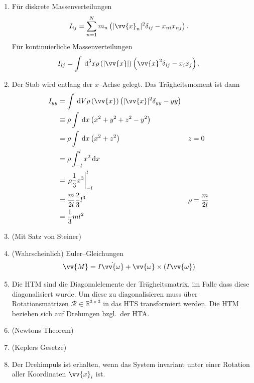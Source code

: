 \documentclass[a4paper,12pt]{article}
\newcommand{\td}{\,\text{d}}
\numberwithin{equation}{section}
\begin{document}
\begin{enumerate}[label=\arabic*.]
        \item Für diskrete Massenverteilungen
                \begin{align*} 
                        I_{ij}&=\sum_{n=1}^{N}m_n\left(|\vv{x}_n|^2\delta _{ij}-x_{ni}x_{nj}\right)
                .\end{align*} 
                Für kontinuierliche Massenverteilungen
                \begin{align*} 
                        I_{ij}&=\int_{}^{}\td ^3x\rho \left(|\vv{x}|\right)\left(\vv{x}^2\delta _{ij}-x_ix_j\right)
                .\end{align*} 
        \item Der Stab wird entlang der $x$--Achse gelegt. Das Trägheitsmoment ist dann
                \begin{align*} 
                        I_{yy}&=\int_{}^{}\td V\rho \left(\vv{x}\right)\left(|\vv{x}|^2\delta _{yy}-yy\right)\\
                              &\equiv \rho \int_{}^{}\td x\left(x^2+y^2+z^2-y^2\right)\\
                              &=\rho \int_{}^{}\td x\left(x^2+z^2\right)&&z=0\\
                              &=\rho \int_{-l}^{l}x^2\td x\\
                              &=\left.\rho \dfrac{1}{3}x^3\right|_{-l}^l\\
                              &=\dfrac{m}{2l}\dfrac{2}{3}l^3&&\rho =\dfrac{m}{2l}\\
                              &=\dfrac{1}{3}ml^2
                \end{align*} 
        \item (Mit Satz von Steiner)
        \item (Wahrscheinlich) Euler--Gleichungen
                \begin{align*} 
                        \vv{M}&=I\dot{\vv{\omega }}+\vv{\omega }\times \left(I\vv{\omega }\right)
                \end{align*} 
        \item Die HTM sind die Diagonalelemente der Trägheitsmatrix, im Falle dass diese diagonalisiert wurde. Um diese zu diagonalisieren muss über Rotationsmatrizen $\mathcal{R} \in \mathbb{R}^{3\times 3}$ in das HTS transformiert werden. Die HTM beziehen sich auf Drehungen bzgl.\ der HTA.
        \item (Newtons Theorem)
        \item (Keplers Gesetze)
        \item Der Drehimpuls ist erhalten, wenn das System invariant unter einer Rotation aller Koordinaten $\vv{x}_i$ ist.

\end{enumerate}
\end{document}
